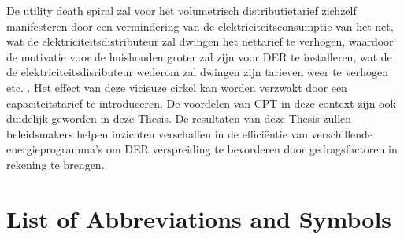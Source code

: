 \documentclass[master=ene,english]{kulemt}
\begin{document}
\begin{abstract*}
 \newline \noindent
De utility death spiral zal voor het volumetrisch distributietarief zichzelf manifesteren door een vermindering van de elektriciteitsconsumptie van het net, wat de elektriciteitsdistributeur zal dwingen het nettarief te verhogen, waardoor de motivatie voor de huishouden groter zal zijn voor DER te installeren, wat de de elektriciteitsdisributeur wederom zal dwingen zijn tarieven weer te verhogen etc. . Het effect van deze vicieuze cirkel kan worden verzwakt door een capaciteitstarief te introduceren. De voordelen van CPT in deze context zijn ook duidelijk geworden in deze Thesis.
\newline \noindent
De resultaten van deze Thesis zullen beleidsmakers helpen inzichten verschaffen in de effici\"{e}ntie van verschillende energieprogramma's om DER verspreiding te bevorderen door gedragsfactoren in rekening te brengen. 
\end{abstract*}	
\listoffiguresandtables
\chapter{List of Abbreviations and Symbols}
\end{document}
